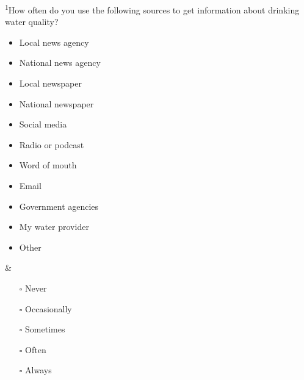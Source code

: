 \documentclass[
]{article}
\begin{document}
\begin{longtblr}[         %
caption={},
entry=none,label=none,
note{1}={Matrix style question.},
label=tblr:quest,
caption={Survey questions.},
]
\textsuperscript{1}How often do you use the following sources to get information about drinking water quality?    \begin{itemize}[nosep]    \item Local news agency    \item National news agency    \item Local newspaper    \item National newspaper    \item Social media    \item Radio or podcast    \item Word of mouth    \item Email    \item Government agencies    \item My water provider    \item Other    \end{itemize} & \begin{itemize}[nosep]    \item[$\square$] Never    \item[$\square$] Occasionally    \item[$\square$] Sometimes    \item[$\square$] Often    \item[$\square$] Always    \end{itemize}                                                                                                                                                                                                                                                                                                                                                                                                  \\
\bottomrule
\end{longtblr}
\end{document}
